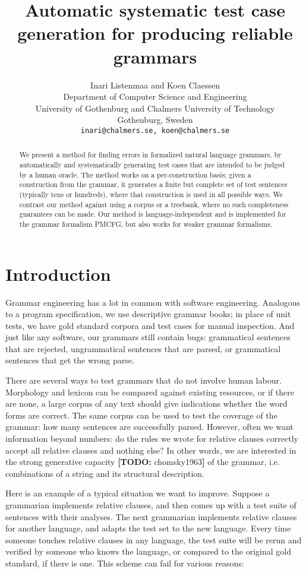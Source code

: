 \documentclass[11pt]{article}
\title{Automatic systematic test case generation for producing reliable grammars}
\author{Inari Listenmaa and Koen Claessen \\
  Department of Computer Science and Engineering \\
  University of Gothenburg and Chalmers University of Technology \\
  Gothenburg, Sweden \\
  {\tt inari@chalmers.se, koen@chalmers.se} }
\date{}
\newcommand{\todo}[1]{{\color{cyan}\textbf{[TODO: }#1\textbf{]}}}
\begin{document}
\maketitle
\begin{abstract}
We present a method for finding errors in formalized natural language grammars, by automatically and systematically generating test cases that are intended to be judged by a human oracle. The method works on a per-construction basis; given a construction from the grammar, it generates a finite but complete set of test sentences (typically tens or hundreds), where that construction is used in all possible ways. We contrast our method against using a corpus or a treebank, where no such completeness guarantees can be made. Our method is language-independent and is implemented for the grammar formalism PMCFG, but also works for weaker grammar formalisms.
\end{abstract}

\section{Introduction}

Grammar engineering has a lot in common with software
engineering. Analogous to a program specification, we use
descriptive grammar books; in place of unit tests, we have gold
standard corpora and test cases for manual inspection.
And just like any software, our grammars still contain bugs:
grammatical sentences that are rejected, ungrammatical
sentences that are parsed, or grammatical sentences that get the wrong
parse.

There are several ways to test grammars that do not involve human
labour. Morphology and lexicon can be compared against existing resources, or
if there are none, a large corpus of any text should give indications
whether the word forms are correct. The same corpus can be used to
test the coverage of the grammar: how many sentences are successfully parsed.
However, often we want information beyond numbers: do the rules we
wrote for relative clauses correctly accept all relative clauses and
nothing else? In other words, we are interested in the strong
generative capacity \todo{chomsky1963} of the grammar, i.e. combinations
of a string and its structural description.

Here is an example of a typical situation we want to improve. Suppose a
grammarian implements relative clauses, and then comes up with a test
suite of sentences with their analyses. The next grammarian implements
relative clauses for another language, and adapts the test set to the
new language. Every time someone touches relative clauses 
in any language, the test suite will be rerun and verified by
someone who knows the language, or compared to the original gold standard, 
if there is one. This scheme can fail for various reasons: 
\end{document}
